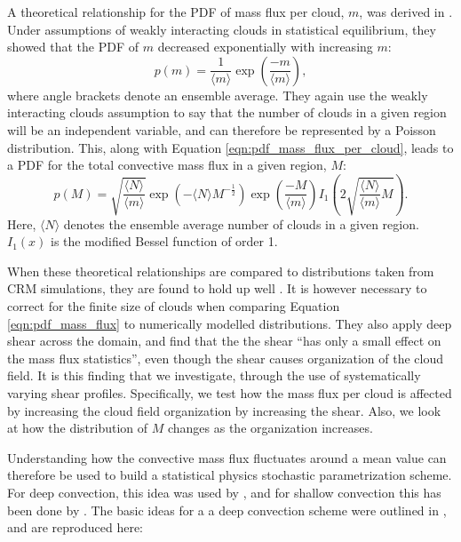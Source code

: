 \documentclass[11pt,a4paper]{article}
\newcommand\todo[1]{\textbf{TODO: #1}}
\begin{document}
A theoretical relationship for the PDF of mass flux per cloud, $m$, was derived in \cite{CC2006I}. Under assumptions of weakly interacting clouds in statistical equilibrium, they showed that the PDF of $m$ decreased exponentially with increasing $m$:
\begin{equation}
    p(m) = \frac{1}{\langle m \rangle} \exp \left(\frac{-m}{\langle m \rangle} \right),
    \label{eqn:pdf_mass_flux_per_cloud}
\end{equation}
where angle brackets denote an ensemble average. They again use the weakly interacting clouds assumption to say that the number of clouds in a given region will be an independent variable, and can therefore be represented by a Poisson distribution. This, along with Equation \ref{eqn:pdf_mass_flux_per_cloud}, leads to a PDF for the total convective mass flux in a given region, $M$:
\begin{equation}
    p(M) = \sqrt{\frac{\langle N \rangle}{\langle m \rangle}} \exp \left( -\langle N \rangle M^{-\frac{1}{2}} \right) \exp \left( \frac{-M}{\langle m \rangle} \right)  I_1\left(2 \sqrt{\frac{\langle N \rangle}{\langle m \rangle} M}\right).
    \label{eqn:pdf_mass_flux}
\end{equation}
Here, $\langle N \rangle$ denotes the ensemble average number of clouds in a given region. $I_1(x)$ is the modified Bessel function of order 1.

When these theoretical relationships are compared to distributions taken from CRM simulations, they are found to hold up well \parencite{CC2006II}. It is however necessary to correct for the finite size of clouds when comparing Equation \ref{eqn:pdf_mass_flux} to numerically modelled distributions. They also apply deep shear across the domain, and find that the the shear ``has only a small effect on the mass flux statistics'', even though the shear causes organization of the cloud field. 
It is this finding that we investigate, through the use of systematically varying shear profiles. Specifically, we test how the mass flux per cloud is affected by increasing the cloud field organization by increasing the shear. Also, we look at how the distribution of $M$ changes as the organization increases.

Understanding how the convective mass flux fluctuates around a mean value can therefore be used to build a statistical physics stochastic parametrization scheme. For deep convection, this idea was used by \cite{PC2008}, and for shallow convection this has been done by \cite{sakradzija2016stochastic}. The basic ideas for a a deep convection scheme were outlined in \cite{PC2008}, and are reproduced here:
\end{document}

